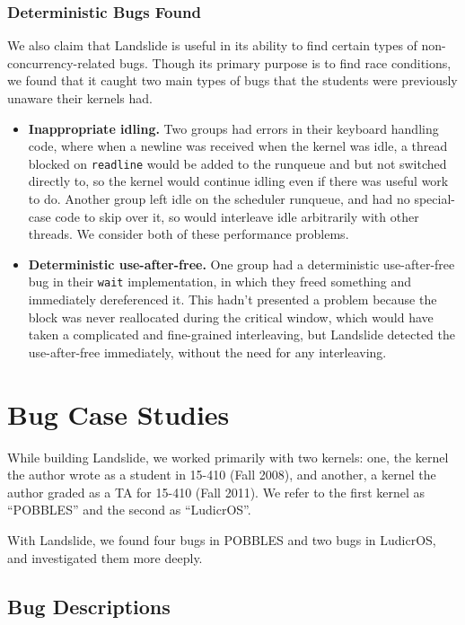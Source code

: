 \subsubsection{Deterministic Bugs Found}

We also claim that Landslide is useful in its ability to find certain types of non-concurrency-related bugs. Though its primary purpose is to find race conditions, we found that it caught two main types of bugs that the students were previously unaware their kernels had.

\begin{itemize}
	\item {\bf Inappropriate idling.} Two groups had errors in their keyboard handling code, where when a newline was received when the kernel was idle, a thread blocked on \texttt{readline} would be added to the runqueue and but not switched directly to, so the kernel would continue idling even if there was useful work to do. Another group left idle on the scheduler runqueue, and had no special-case code to skip over it, so would interleave idle arbitrarily with other threads. We consider both of these performance problems.
	\item {\bf Deterministic use-after-free.} One group had a deterministic use-after-free bug in their \texttt{wait} implementation, in which they freed something and immediately dereferenced it. This hadn't presented a problem because the block was never reallocated during the critical window, which would have taken a complicated and fine-grained interleaving, but Landslide detected the use-after-free immediately, without the need for any interleaving.
\end{itemize}

\section{Bug Case Studies}
\label{sec:eval-casestudy}

While building Landslide, we worked primarily with two kernels: one, the kernel the author wrote as a student in 15-410 (Fall 2008), and another, a kernel the author graded as a TA for 15-410 (Fall 2011). We refer to the first kernel as ``POBBLES'' and the second as ``LudicrOS''.

With Landslide, we found four bugs in POBBLES and two bugs in LudicrOS, and investigated them more deeply.

\subsection{Bug Descriptions}

